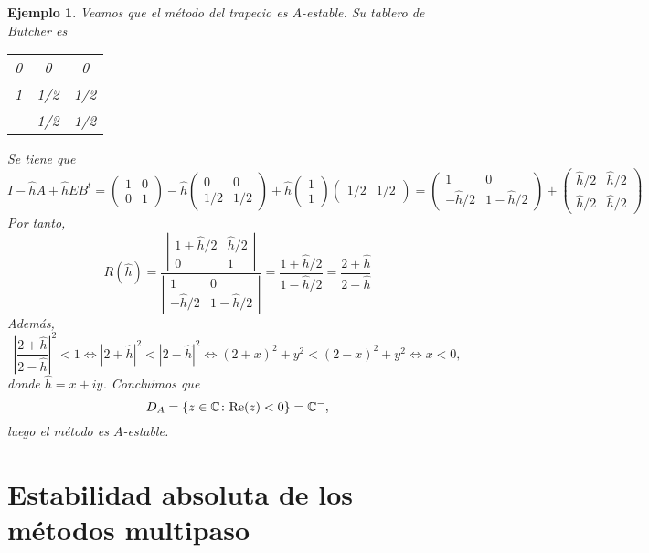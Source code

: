 \documentclass[11pt]{report}
\theoremstyle{mytheorem}
\theoremstyle{mydefinition}
\theoremstyle{myexample}
\newtheorem*{example}{Ejemplo}
\newcommand{\C}{\mathbb C}
\begin{document}
\begin{example}
Veamos que el método del trapecio es $A$-estable. Su tablero de Butcher es
\begin{center}
\setlength\extrarowheight{2.5pt}
\begin{tabular}{c|cc}
    0 & 0 & 0 \\
    1 & 1/2 & 1/2 \\ \hline
    & 1/2 & 1/2
\end{tabular}
\end{center}
Se tiene que
\[I-\hat{h}A+\hat{h}EB^t  = \left( \begin{array}{cc}
    1 & 0 \\
    0 & 1
\end{array} \right) - \hat{h} \left( \begin{array}{cc}
    0 & 0 \\
    1/2 & 1/2
\end{array} \right) + \hat{h} \left( \begin{array}{c}
1\\
1
\end{array} \right) \left( \begin{array}{cc}
1/2 & 1/2
\end{array} \right) = \left( \begin{array}{cc}
    1 & 0 \\
    -\hat{h}/2 & 1-\hat{h}/2
\end{array} \right) + \left( \begin{array}{cc}
    \hat{h}/2 & \hat{h}/2 \\
    \hat{h}/2 & \hat{h}/2
\end{array} \right)\]
Por tanto,
\[R(\hat{h}) = \frac{\left| \begin{array}{cc}
    1+\hat{h}/2 & \hat{h}/2 \\
    0 & 1
\end{array} \right|}{\left|\begin{array}{cc}
    1 & 0 \\
    -\hat{h}/2 & 1-\hat{h}/2
\end{array} \right|} =\frac{1+\hat{h}/2}{1-\hat{h}/2} = \frac{2+\hat{h}}{2-\hat{h}}\]
Además,
\[\left|\frac{2+\hat{h}}{2-\hat{h}}\right|^2 <1 \iff |2+\hat{h}|^2<|2-\hat{h}|^2 \iff (2+x)^2+y^2<(2-x)^2+y^2 \iff x < 0 ,\]
donde $\hat{h} = x+iy$. Concluimos que
\[D_A = \{z \in \C \colon \textup{Re}(z) < 0\} = \C^-,\]
luego el método es $A$-estable.
\end{example}

\section{Estabilidad absoluta de los métodos multipaso}
\end{document}
